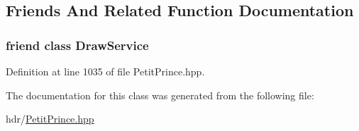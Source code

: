 \subsection{Friends And Related Function Documentation}
\subsubsection[{\texorpdfstring{Draw\+Service}{DrawService}}]{\setlength{\rightskip}{0pt plus 5cm}friend class {\bf Draw\+Service}\hspace{0.3cm}{\ttfamily [friend]}}\hypertarget{class__objref___draw_service_a62bdd6963f13b584c2898676eeb9951d}{}\label{class__objref___draw_service_a62bdd6963f13b584c2898676eeb9951d}


Definition at line 1035 of file Petit\+Prince.\+hpp.



The documentation for this class was generated from the following file\+:\begin{DoxyCompactItemize}
\item 
hdr/\hyperlink{_petit_prince_8hpp}{Petit\+Prince.\+hpp}\end{DoxyCompactItemize}
